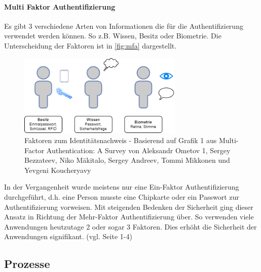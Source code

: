 \documentclass[11pt]{article}
\begin{document}
\paragraph{Multi Faktor Authentifizierung}
Es gibt 3 verschiedene Arten von Informationen die für die Authentifizierung verwendet werden können. So z.B. Wissen, Besitz oder Biometrie. Die Unterscheidung der Faktoren ist in \cref{fig:mfa} dargestellt.
\begin{figure}[H]
  \centering
  \includegraphics[width=0.7\textwidth]{assets/mfa.png}
  \caption{Faktoren zum Identitätsnachweis - Basierend auf Grafik 1 aus Multi-Factor Authentication: A Survey von Aleksandr Ometov 1, Sergey Bezzateev, Niko Mäkitalo, Sergey Andreev, Tommi Mikkonen und Yevgeni Koucheryavy}\label{figure:mfa}
\end{figure}
In der Vergangenheit wurde meistens nur eine Ein-Faktor Authentifizierung durchgeführt, d.h. eine Person musste eine Chipkarte oder ein Passwort zur Authentifizierung vorweisen. Mit steigenden Bedenken der Sicherheit ging dieser Ansatz in Richtung der Mehr-Faktor Authentifizierung über. So verwenden viele Anwendungen heutzutage 2 oder sogar 3 Faktoren. Dies erhöht die Sicherheit der Anwendungen signifikant. (vgl. \cite{ometov2018multi} Seite 1-4)
\subsection{Prozesse}
\end{document}

